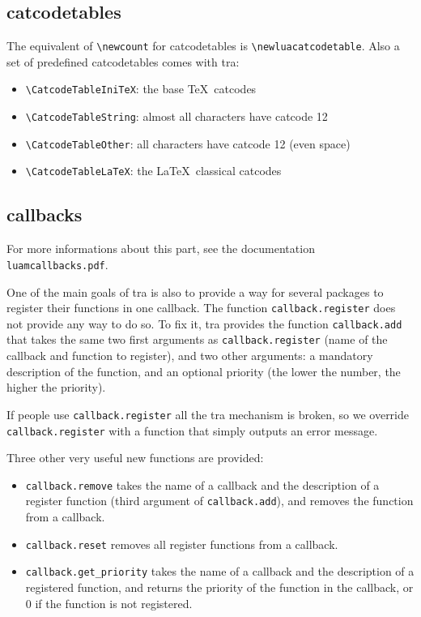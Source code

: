 \documentclass{article}
\newcommand\code{\texttt}
\begin{document}
\subsection{catcodetables}

The equivalent of \verb+\newcount+ for catcodetables is
\verb+\newluacatcodetable+. Also a set of predefined catcodetables
comes with \LuaTeX tra:

\begin{itemize}
  \item \verb+\CatcodeTableIniTeX+: the base \TeX\ catcodes
  \item \verb+\CatcodeTableString+: almost all characters have
    catcode 12
  \item \verb+\CatcodeTableOther+: all characters have catcode 12
    (even space)
  \item \verb+\CatcodeTableLaTeX+: the \LaTeX\ classical catcodes
\end{itemize}

\subsection{callbacks}

For more informations about this part, see the documentation
\code{luamcallbacks.pdf}.

One of the main goals of \LuaTeX tra is also to provide a way for several
packages to register their functions in one callback. The function
\code{callback.register} does not provide any way to do so. To fix it,
\LuaTeX tra provides the function \code{callback.add} that takes the same
two first arguments as \code{callback.register} (name of the callback and
function to register), and two other arguments: a mandatory description of the
function, and an optional priority (the lower the number, the higher the
priority).

If people use \code{callback.register} all the \LuaTeX tra mechanism is
broken, so we override \code{callback.register} with a function that simply
outputs an error message.

Three other very useful new functions are provided:

\begin{itemize}
  \item \code{callback.remove} takes the name of a callback and the
    description of a register function (third argument of
    \code{callback.add}), and removes the function from a callback.
  \item \code{callback.reset} removes all register functions from a
    callback.
  \item \code{callback.get\_priority} takes the name of a callback and the
    description of a registered function, and returns the priority of the
    function in the callback, or 0 if the function is not registered.
\end{itemize}
\end{document}
